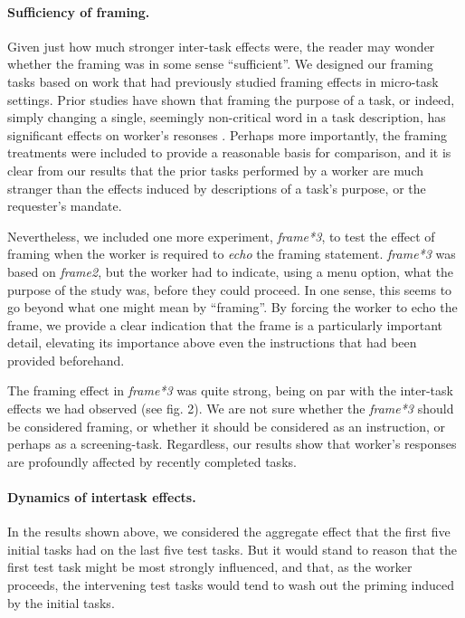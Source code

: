 \documentclass[12pt]{article}
\begin{document}
\paragraph{Sufficiency of framing.} Given just how much stronger
inter-task effects were, the reader may wonder whether the framing was 
in some sense ``sufficient''.  
We designed our framing tasks based on
work that had previously studied framing effects in micro-task settings.  
Prior studies have shown that framing the purpose of a task, or indeed, 
simply changing a single, seemingly non-critical word in a task description, 
has significant effects on worker's resonses \cite{thibodeau2013natural}.  Perhaps more importantly, the 
framing treatments were included to provide a reasonable basis for comparison,
and it is clear from our results that the prior tasks performed by a 
worker are much stranger than the effects induced by descriptions of a task's
purpose, or the requester's mandate.

Nevertheless, we included one more experiment, \textit{frame*3}, to test the 
effect of framing when the worker is required to \textit{echo} the framing 
statement.  \textit{frame*3} was based on \textit{frame2}, but the worker
had to indicate, using a menu option, what the purpose of the study was,
before they could proceed.  In one sense, this seems to go beyond what one
might mean by ``framing''.  By forcing the worker to echo the frame, we provide
a clear indication that the frame is a particularly important detail, 
elevating its importance above even the instructions that had been provided
beforehand.

The framing effect in \textit{frame*3} was quite strong, being on par with the
inter-task effects we had observed (see fig. 2).  We are not sure whether
the \textit{frame*3} should be considered framing,
or whether it should be considered as an instruction, or perhaps as a 
screening-task.  Regardless, our results show that worker's responses are 
profoundly affected by recently completed tasks. 


\paragraph{Dynamics of intertask effects.} 
In the results shown above, we considered the aggregate effect that the
first five initial tasks had on the last five test tasks.  But it would stand
to reason that the first test task might be
most strongly influenced, and that, as the worker proceeds, the intervening 
test tasks would tend to wash out the priming induced by the initial tasks.
\end{document}
